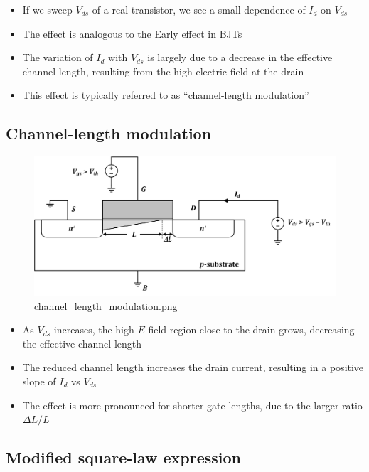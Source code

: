 \documentclass[11pt]{article}
\providecommand{\tightlist}{%
      \setlength{\itemsep}{0pt}\setlength{\parskip}{0pt}}
\begin{document}
    \begin{itemize}
\tightlist
\item
  If we sweep \(V_{ds}\) of a real transistor, we see a small dependence
  of \(I_d\) on \(V_{ds}\)
\item
  The effect is analogous to the Early effect in BJTs
\item
  The variation of \(I_d\) with \(V_{ds}\) is largely due to a decrease
  in the effective channel length, resulting from the high electric
  field at the drain
\item
  This effect is typically referred to as ``channel-length modulation''
\end{itemize}

    \hypertarget{channel-length-modulation}{%
\subsection{Channel-length modulation}\label{channel-length-modulation}}

    \begin{figure}
\centering
\includegraphics{channel_length_modulation.png}
\caption{channel\_length\_modulation.png}
\end{figure}

    \begin{itemize}
\tightlist
\item
  As \(V_{ds}\) increases, the high \(E\)-field region close to the
  drain grows, decreasing the effective channel length
\item
  The reduced channel length increases the drain current, resulting in a
  positive slope of \(I_d\) vs \(V_{ds}\)
\item
  The effect is more pronounced for shorter gate lengths, due to the
  larger ratio \(\Delta L / L\)
\end{itemize}

    \hypertarget{modified-square-law-expression}{%
\subsection{Modified square-law
expression}\label{modified-square-law-expression}}
\end{document}
